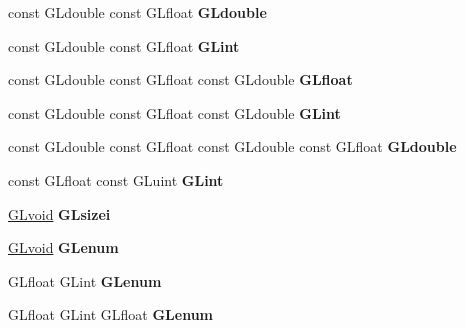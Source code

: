 \begin{DoxyCompactItemize}
const G\+Ldouble const G\+Lfloat {\bfseries G\+Ldouble}
\item 
\mbox{\label{struct_____g_ldispatch_table_rec_adbdca6f11f32b6651ded3200d94c8bde}} 
const G\+Ldouble const G\+Lfloat {\bfseries G\+Lint}
\item 
\mbox{\label{struct_____g_ldispatch_table_rec_aecb032dc56826cf4f9676d2c4a3a4840}} 
const G\+Ldouble const G\+Lfloat const G\+Ldouble {\bfseries G\+Lfloat}
\item 
\mbox{\label{struct_____g_ldispatch_table_rec_a23a756b55bf309fc89f04bf28049d764}} 
const G\+Ldouble const G\+Lfloat const G\+Ldouble {\bfseries G\+Lint}
\item 
\mbox{\label{struct_____g_ldispatch_table_rec_a339fd9ef19614aa039a8915e9f881563}} 
const G\+Ldouble const G\+Lfloat const G\+Ldouble const G\+Lfloat {\bfseries G\+Ldouble}
\item 
\mbox{\label{struct_____g_ldispatch_table_rec_af847cec0308d07465b63014998e24177}} 
const G\+Lfloat const G\+Luint {\bfseries G\+Lint}
\item 
\mbox{\label{struct_____g_ldispatch_table_rec_ad06ecc8b4088ecb41a1511ea86e7ae7f}} 
\hyperlink{interfacevoid}{G\+Lvoid} {\bfseries G\+Lsizei}
\item 
\mbox{\label{struct_____g_ldispatch_table_rec_aec53849940621d0b316aec43ae0f5ac6}} 
\hyperlink{interfacevoid}{G\+Lvoid} {\bfseries G\+Lenum}
\item 
\mbox{\label{struct_____g_ldispatch_table_rec_a546586fd94a6c99fc31e1b82fa56d44e}} 
G\+Lfloat G\+Lint {\bfseries G\+Lenum}
\item 
\mbox{\label{struct_____g_ldispatch_table_rec_a9ea6e221779754fe52035c73eb9db407}} 
G\+Lfloat G\+Lint G\+Lfloat {\bfseries G\+Lenum}
\item 
\mbox{\label{struct_____g_ldispatch_table_rec_a7ce686cdba85e427544574bf85b8c207}} 

\end{DoxyCompactItemize}
